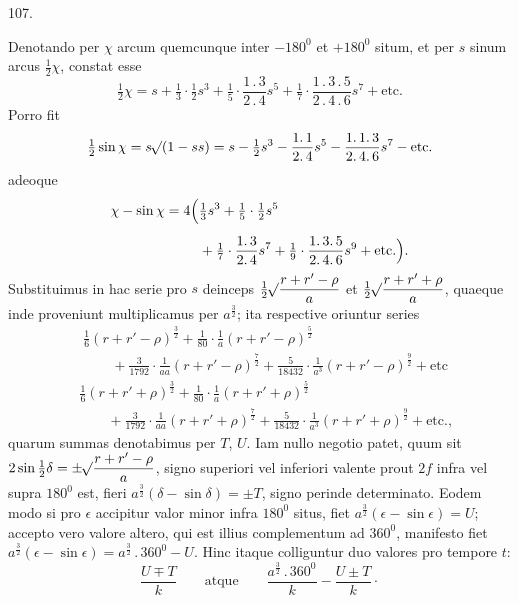 \par{}\medskip
{}
\begin{center}107.\end{center}
Denotando per $\chi$ arcum quemcunque inter $-180^0$ et $+180^0$ situm, et per $s$ sinum arcus $\tfrac12\chi$, constat esse
\[
\tfrac12\chi=s+\tfrac13\cdot\tfrac12s^3+\tfrac15\cdot\frac{1\mathpunct{.}3}{2\mathpunct{.}4}s^5+\tfrac17\cdot\frac{1\mathpunct{.}3\mathpunct{.}5}{2\mathpunct{.}4\mathpunct{.}6}s^7+\text{etc.}
\]
\noindent Porro fit
\[
\tfrac12\sin\chi=s\mathord{{}^{}\!\surd}(1-ss)=s-\tfrac12s^3-\frac{1\mathpunct{.}1}{2\mathpunct{.}4}s^5-\frac{1\mathpunct{.}1\mathpunct{.}3}{2\mathpunct{.}4\mathpunct{.}6}s^7-\text{etc.}
\]
\noindent adeoque
\[
\begin{aligned}
\chi-\sin\chi=4\Bigl(&\tfrac13s^3+\tfrac15\cdot\tfrac12s^5\\[.5em]
&+\tfrac17\cdot\frac{1\mathpunct{.}3}{2\mathpunct{.}4}s^7+\tfrac19\cdot\frac{1\mathpunct{.}3\mathpunct{.}5}{2\mathpunct{.}4\mathpunct{.}6}s^9+\text{etc.}\Bigr).
\end{aligned}
\]
\noindent Substituimus in hac serie pro $s$ deinceps $\tfrac12\mathord{{}^{}\!\surd}\dfrac{r+r'-\rho}{a}$ et $\tfrac12\mathord{{}^{}\!\surd}\dfrac{r+r'+\rho}{a}$, quaeque inde proveniunt multiplicamus per $a^{\frac32}$; ita respective oriuntur series
\[
\begin{aligned}
&\tfrac16(r+r'-\rho)^{\frac32}+\tfrac1{80}\cdot\frac1a(r+r'-\rho)^{\frac52}\\[.5em]
&\qquad+\tfrac3{1792}\cdot\frac1{aa}(r+r'-\rho)^{\frac72}+\tfrac5{18432}\cdot\frac1{a^3}(r+r'-\rho)^{\frac92}+\text{etc}
\end{aligned}
\]
\[
\begin{aligned}
&\tfrac16(r+r'+\rho)^{\frac32}+\tfrac1{80}\cdot\frac1a(r+r'+\rho)^{\frac52}\\[.5em]
&\qquad+\tfrac3{1792}\cdot\frac1{aa}(r+r'+\rho)^{\frac72}+\tfrac5{18432}\cdot\frac1{a^3}(r+r'+\rho)^{\frac92}+\text{etc.,}
\end{aligned}
\]
\noindent quarum summas denotabimus per $T$, $U$. Iam nullo negotio patet, quum sit $2\sin\tfrac12\delta=\pm\mathord{{}^{}\!\surd}\dfrac{r+r'-\rho}{a}$, signo superiori vel inferiori valente prout $2f$ infra vel supra $180^0$ est, fieri $a^{\frac32}(\delta-\sin\delta)=\pm T$, signo perinde determinato. Eodem modo si pro $\epsilon$ accipitur valor minor infra $180^0$ situs, fiet $a^{\frac32}(\epsilon-\sin\epsilon)=U$; accepto vero valore altero, qui est illius complementum ad $360^0$, manifesto fiet $a^{\frac32}(\epsilon-\sin\epsilon)=a^{\frac32}\mathpunct{.}360^0-U$. Hinc itaque colliguntur duo valores pro tempore $t$:
\[
\frac{U\mp T}{k}\qquad\text{atque}\qquad\frac{a^{\frac32}\mathpunct{.}360^0}{k}-\frac{U\pm T}{k}\mathpunct{\cdot}
\]
